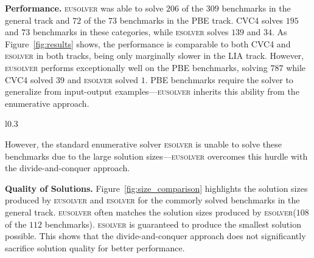 \documentclass{llncs}
\newcommand{\dcsolve}{{\sffamily\fontsize{8.5}{10}\selectfont
    DCSolve}\xspace}
\renewcommand{\paragraph}[1]{\par\noindent\textbf{#1.}}
\newcommand{\esolver}{\textsc{esolver}\xspace}
\newcommand{\eusolver}{\textsc{eusolver}\xspace}
\begin{document}
\paragraph{Performance}
\eusolver was able to solve $206$ of the $309$ benchmarks in the
general track and $72$ of the $73$ benchmarks in the
PBE track. 
CVC4 solves $195$ and $73$ benchmarks in these categories, while 
\esolver solves $139$ and $34$.
As Figure~\ref{fig:results} shows, the performance is comparable to both
CVC4 and \esolver in both tracks, being only marginally slower in
the LIA track.
However, \eusolver performs exceptionally well on the PBE benchmarks,
solving $787$ while CVC4 solved $39$ and \esolver solved $1$.
PBE benchmarks require the solver
to generalize from input-output examples---\eusolver inherits this
ability from the enumerative approach.
\begin{wrapfigure}{l}{0.3\textwidth}%
\centering
  \caption{Scatter plot of \eusolver and \esolver solution sizes.}
    \label{fig:size_comparison}
\vspace*{-1ex}
\end{wrapfigure}
However, the standard enumerative solver \esolver is unable to solve
these benchmarks due to the large solution sizes---\eusolver overcomes
this hurdle with the divide-and-conquer approach.


\paragraph{Quality of Solutions}
Figure~\ref{fig:size_comparison} highlights the solution sizes produced by
\eusolver and \esolver  for the commorly solved benchmarks in the
general track.
\eusolver often matches the solution sizes produced by
\esolver ($108$ of the $112$ benchmarks).
\esolver is guaranteed to produce the smallest solution
possible.
This shows that the divide-and-conquer approach
does not significantly sacrifice solution quality for better
performance. 
\end{document}
